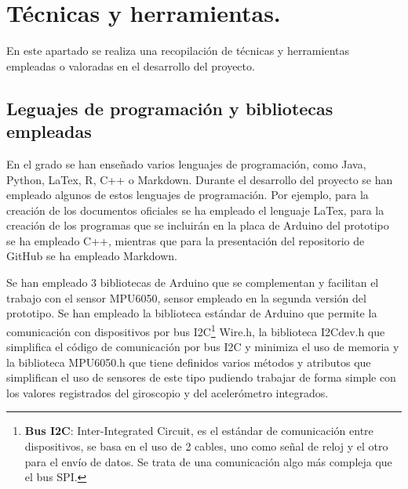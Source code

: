  
\section{Técnicas y herramientas.}
En este apartado se realiza una recopilación de técnicas y herramientas empleadas o valoradas en el desarrollo del proyecto.

\subsection{Leguajes de programación y bibliotecas empleadas}
En el grado se han enseñado varios lenguajes de programación, como Java, Python, LaTex, R, C++ o Markdown. Durante el desarrollo del proyecto se han empleado algunos de estos lenguajes de programación. Por ejemplo, para la creación de los documentos oficiales se ha empleado el lenguaje LaTex, para la creación de los programas que se incluirán en la placa de Arduino del prototipo se ha empleado C++, mientras que para la presentación del repositorio de GitHub se ha empleado Markdown.

Se han empleado 3 bibliotecas de Arduino que se complementan y facilitan el trabajo con el sensor MPU6050, sensor empleado en la segunda versión del prototipo. Se han empleado la biblioteca estándar de Arduino que permite la comunicación con dispositivos por bus I2C\footnote{\textbf{Bus I2C}: Inter-Integrated Circuit, es el estándar de comunicación entre dispositivos, se basa en el uso de 2 cables, uno como señal de reloj y el otro para el envío de datos. Se trata de una comunicación algo más compleja que el bus SPI.}\cite{I2C} Wire.h\cite{LibWire}, la biblioteca I2Cdev.h\cite{LibI2Cdev} que simplifica el código de comunicación por bus I2C y minimiza el uso de memoria y la biblioteca MPU6050.h\cite{LibMPU6050} que tiene definidos varios métodos y atributos que simplifican el uso de sensores de este tipo pudiendo trabajar de forma simple con los valores registrados del giroscopio y del acelerómetro integrados.


